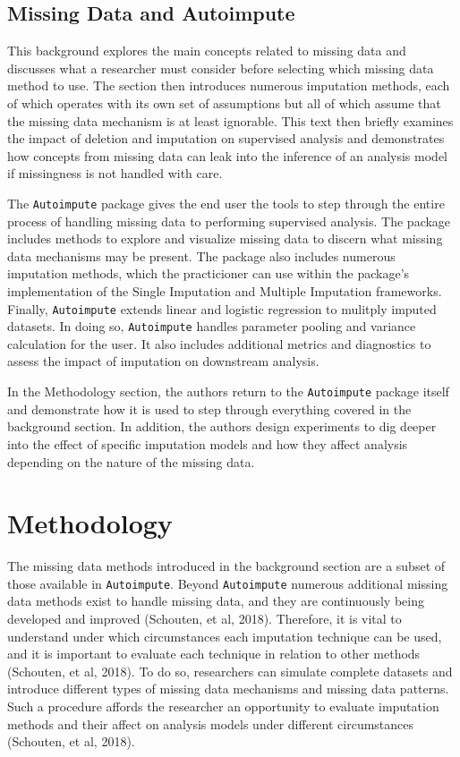 \documentclass[12pt,oneside]{chicagocapstone}
\begin{document}
\section*{Missing Data and
Autoimpute}\label{background-missing-data-autoimpute}

This background explores the main concepts related to missing data and
discusses what a researcher must consider before selecting which missing
data method to use. The section then introduces numerous imputation
methods, each of which operates with its own set of assumptions but all
of which assume that the missing data mechanism is at least ignorable.
This text then briefly examines the impact of deletion and imputation on
supervised analysis and demonstrates how concepts from missing data can
leak into the inference of an analysis model if missingness is not
handled with care.

The \texttt{Autoimpute} package gives the end user the tools to step
through the entire process of handling missing data to performing
supervised analysis. The package includes methods to explore and
visualize missing data to discern what missing data mechanisms may be
present. The package also includes numerous imputation methods, which
the practicioner can use within the package's implementation of the
Single Imputation and Multiple Imputation frameworks. Finally,
\texttt{Autoimpute} extends linear and logistic regression to mulitply
imputed datasets. In doing so, \texttt{Autoimpute} handles parameter
pooling and variance calculation for the user. It also includes
additional metrics and diagnostics to assess the impact of imputation on
downstream analysis.

In the Methodology section, the authors return to the
\texttt{Autoimpute} package itself and demonstrate how it is used to
step through everything covered in the background section. In addition,
the authors design experiments to dig deeper into the effect of specific
imputation models and how they affect analysis depending on the nature
of the missing data.

\hypertarget{methodology}{\chapter*{Methodology}\label{methodology}}

The missing data methods introduced in the background section are a
subset of those available in \texttt{Autoimpute}. Beyond
\texttt{Autoimpute} numerous additional missing data methods exist to
handle missing data, and they are continuously being developed and
improved (Schouten, et al, 2018). Therefore, it is vital to understand
under which circumstances each imputation technique can be used, and it
is important to evaluate each technique in relation to other methods
(Schouten, et al, 2018). To do so, researchers can simulate complete
datasets and introduce different types of missing data mechanisms and
missing data patterns. Such a procedure affords the researcher an
opportunity to evaluate imputation methods and their affect on analysis
models under different circumstances (Schouten, et al, 2018).
\end{document}
